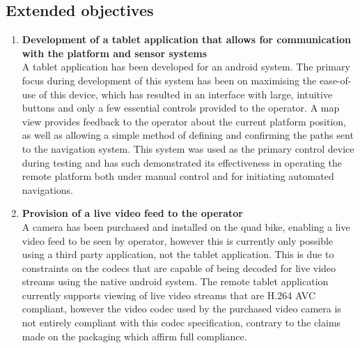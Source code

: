 \documentclass[main.tex]{subfiles}
\begin{document}
\subsection{Extended objectives}
\begin{enumerate}
\item \textbf{Development of a tablet application that allows for communication with the platform and sensor systems}\\ 
A tablet application has been developed for an android system. The primary focus during development of this system has been on maximising the ease-of-use of this device, which has resulted in an interface with large, intuitive buttons and only a few essential controls provided to the operator. 
A map view provides feedback to the operator about the current platform position, as well as allowing a simple method of defining and confirming the paths sent to the navigation system.
This system was used as the primary control device during testing and has such demonstrated its effectiveness in operating the remote platform both under manual control and for initiating automated navigations. 



\item \textbf{Provision of a live video feed to the operator}\\ 
A camera has been purchased and installed on the quad bike, enabling a live video feed to be seen by operator, however this is currently only possible using a third party application, not the tablet application.
This is due to constraints on the codecs that are capable of being decoded for live video streams using the native android system. The remote tablet application currently supports viewing of live video streams that are H.264 AVC compliant, however the video codec used by the purchased video camera is not entirely compliant with this codec specification, contrary to the claims made on the packaging which affirm full compliance.


\end{enumerate}
\end{document}
